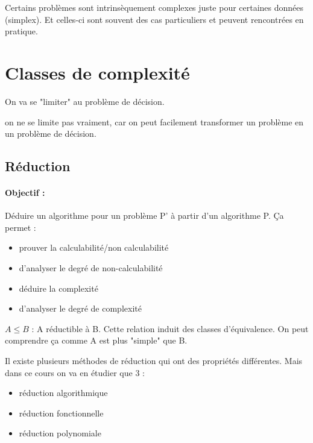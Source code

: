 \begin{myrem}
	Certains problèmes sont intrinsèquement complexes juste pour certaines 
	données (simplex). Et celles-ci sont souvent des cas particuliers et peuvent 
	rencontrées en pratique.
\end{myrem}


\section{Classes de complexité}
\label{sec:classes_de_complexit_}
On va se "limiter" au problème de décision.

\begin{myrem}
	on ne se limite pas vraiment, car on 
	peut facilement transformer un problème en un problème de décision.
\end{myrem}

\subsection{Réduction}
\label{sub:r_duction}

\paragraph{Objectif :} Déduire un algorithme pour un problème P' à partir d'un 
algorithme P. Ça permet :
\begin{itemize}
	\item prouver la calculabilité/non calculabilité
	\item d'analyser le degré de non-calculabilité
	\item déduire la complexité
	\item d'analyser le degré de complexité
\end{itemize}

\begin{mydef}
	$A \leq B$ : A réductible à B. Cette relation induit des classes 
	d'équivalence. On peut comprendre ça comme A est plus "simple" que B.
\end{mydef}

Il existe plusieurs méthodes de réduction qui ont des propriétés différentes.
Mais dans ce cours on va en étudier 
que 3 :
\begin{itemize}
	\item réduction algorithmique
	\item réduction fonctionnelle 
	\item réduction polynomiale
\end{itemize}

